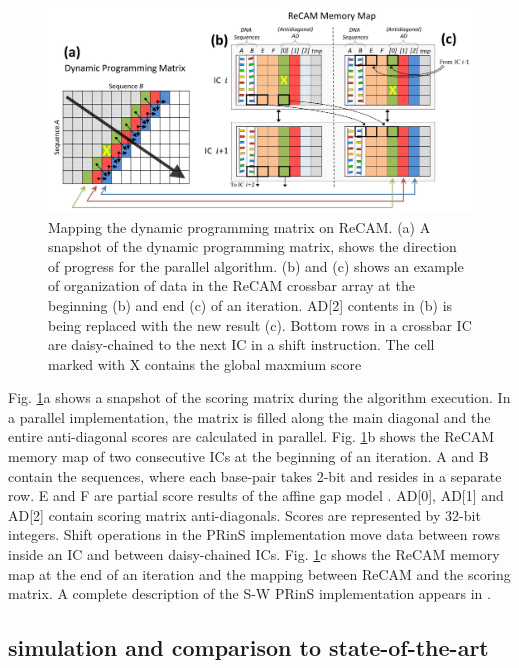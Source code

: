 \documentclass{superfri}
\begin{document}
	\begin{figure}[h!]
		\centerline{\includegraphics[scale=0.6]{Figures/SW_on_ReCAM_Figure.jpg}}
		\caption{Mapping the dynamic programming matrix on ReCAM. (a) A snapshot of the dynamic programming matrix, shows the direction of progress for the parallel algorithm. (b) and (c) shows an example of organization of data in the ReCAM crossbar array at the beginning (b) and end (c) of an iteration. AD[2] contents in (b) is being replaced with the new result (c). Bottom rows in a crossbar IC are daisy-chained to the next IC in a shift instruction. The cell marked with X contains the global maxmium score}
		\label{fig:SWonReCAM}
	\end{figure}
	
	Fig. \ref{fig:SWonReCAM}a shows a snapshot of the scoring matrix during the algorithm execution. In a parallel implementation, the matrix is filled along the main diagonal and the entire anti-diagonal scores are calculated in parallel. Fig. \ref{fig:SWonReCAM}b shows the ReCAM memory map of two consecutive ICs at the beginning of an iteration. A and B contain the sequences, where each base-pair takes 2-bit and resides in a separate row. E and F are partial score results of the affine gap model \cite{gotoh1982improved}. AD[0], AD[1] and AD[2] contain scoring matrix anti-diagonals. Scores are represented by 32-bit integers. Shift operations in the PRinS implementation move data between rows inside an IC and between daisy-chained ICs. Fig. \ref{fig:SWonReCAM}c shows the ReCAM memory map at the end of an iteration and the mapping between ReCAM and the scoring matrix. A complete description of the S-W PRinS implementation appears in \cite{kaplan2017resistive}.
	
	\subsection{simulation and comparison to state-of-the-art}
	\label{sec:SW_simulation}
	
\end{document}
